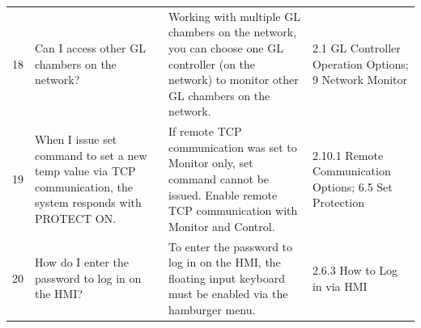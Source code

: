 \begin{longtable}[]{@{}|l|l|l|l|@{}}
 \begin{minipage}[t]{0.08\columnwidth}\raggedright
18\strut
\end{minipage} & \begin{minipage}[t]{0.30\columnwidth}\raggedright
Can I access other GL chambers on the network?\strut
\end{minipage} & \begin{minipage}[t]{0.33\columnwidth}\raggedright
Working with multiple GL chambers on the network, you can choose one GL
controller (on the network) to monitor other GL chambers on the
network.\strut
\end{minipage} & \begin{minipage}[t]{0.17\columnwidth}\raggedright
2.1 GL Controller Operation Options; 9 Network Monitor\strut
\end{minipage}\tabularnewline
 \begin{minipage}[t]{0.08\columnwidth}\raggedright
19\strut
\end{minipage} & \begin{minipage}[t]{0.30\columnwidth}\raggedright
When I issue set command to set a new temp value via TCP communication,
the system responds with PROTECT ON.\strut
\end{minipage} & \begin{minipage}[t]{0.33\columnwidth}\raggedright
If remote TCP communication was set to Monitor only, set command cannot
be issued. Enable remote TCP communication with Monitor and
Control.\strut
\end{minipage} & \begin{minipage}[t]{0.17\columnwidth}\raggedright
2.10.1 Remote Communication Options; 6.5 Set Protection\strut
\end{minipage}\tabularnewline
\begin{minipage}[t]{0.08\columnwidth}\raggedright
20\strut
\end{minipage} & \begin{minipage}[t]{0.30\columnwidth}\raggedright
How do I enter the password to log in on the HMI?\strut
\end{minipage} & \begin{minipage}[t]{0.33\columnwidth}\raggedright
To enter the password to log in on the HMI, the floating input keyboard
must be enabled via the hamburger menu.\strut
\end{minipage} & \begin{minipage}[t]{0.17\columnwidth}\raggedright
2.6.3 How to Log in via HMI\strut
\end{minipage}\tabularnewline
\bottomrule
\end{longtable}